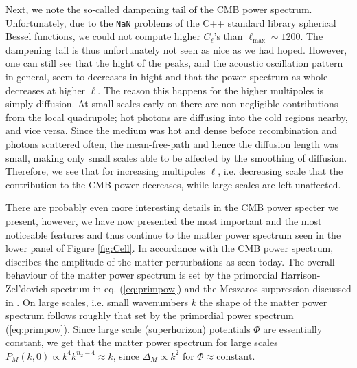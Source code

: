 \documentclass[twocolumn]{aastex62}
\begin{document}
Next, we note the so-called dampening tail of the CMB power spectrum. Unfortunately, due to the \texttt{NaN} problems of the C++ standard library spherical Bessel functions, we could not compute higher $C_\ell$'s than $\ell_\text{max} \sim 1200$. The dampening tail is thus unfortunately not seen as nice as we had hoped. However, one can still see that the hight of the peaks, and the acoustic oscillation pattern in general, seem to decreases in hight and that the power spectrum as whole decreases at higher $\ell$. The reason this happens for the higher multipoles is simply diffusion. At small scales early on there are non-negligible contributions from the local quadrupole; hot photons are diffusing into the cold regions nearby, and vice versa. Since the medium was hot and dense before recombination and photons scattered often, the mean-free-path and hence the diffusion length was small, making only small scales able to be affected by the smoothing of diffusion. Therefore, we see that for increasing multipoles $\ell$, i.e. decreasing scale that the contribution to the CMB power decreases, while large scales are left unaffected.

There are probably even more interesting details in the CMB power specter we present, however, we have now presented the most important and the most noticeable features and thus continue to the matter power spectrum seen in the lower panel of Figure \ref{fig:Cell}. In accordance with the CMB power spectrum, discribes the amplitude of the matter perturbations as seen today. The overall behaviour of the matter power spectrum is set by the primordial Harrison-Zel'dovich spectrum in eq. (\ref{eq:primpow}) and the Meszaros suppression discussed in \cite{stutzer:2020c}.
On large scales, i.e. small wavenumbers $k$ the shape of the matter power spectrum follows roughly that set by the primordial power spectrum (\ref{eq:primpow}). Since large scale (superhorizon) potentials $\Phi$ are essentially constant, we get that the matter power spectrum for large scales $P_M(k, 0) \propto k^4 k^{n_2 - 4} \approx k$, since $\Delta_M \propto k^2$ for $\Phi \approx \text{constant}$.
\end{document}
